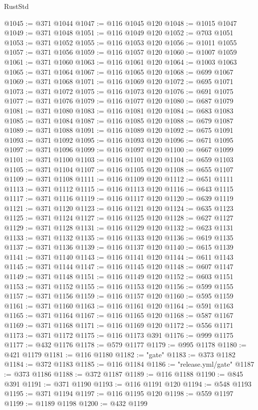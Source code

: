 \begin{lexlean}{RustStd}
\begin{coremodule}
@1045 := @371 @1044
@1047 := @116 @1045 @120
@1048 := @1015 @1047
@1049 := @371 @1048
@1051 := @116 @1049 @120
@1052 := @703 @1051
@1053 := @371 @1052
@1055 := @116 @1053 @120
@1056 := @1011 @1055
@1057 := @371 @1056
@1059 := @116 @1057 @120
@1060 := @1007 @1059
@1061 := @371 @1060
@1063 := @116 @1061 @120
@1064 := @1003 @1063
@1065 := @371 @1064
@1067 := @116 @1065 @120
@1068 := @699 @1067
@1069 := @371 @1068
@1071 := @116 @1069 @120
@1072 := @695 @1071
@1073 := @371 @1072
@1075 := @116 @1073 @120
@1076 := @691 @1075
@1077 := @371 @1076
@1079 := @116 @1077 @120
@1080 := @687 @1079
@1081 := @371 @1080
@1083 := @116 @1081 @120
@1084 := @683 @1083
@1085 := @371 @1084
@1087 := @116 @1085 @120
@1088 := @679 @1087
@1089 := @371 @1088
@1091 := @116 @1089 @120
@1092 := @675 @1091
@1093 := @371 @1092
@1095 := @116 @1093 @120
@1096 := @671 @1095
@1097 := @371 @1096
@1099 := @116 @1097 @120
@1100 := @667 @1099
@1101 := @371 @1100
@1103 := @116 @1101 @120
@1104 := @659 @1103
@1105 := @371 @1104
@1107 := @116 @1105 @120
@1108 := @655 @1107
@1109 := @371 @1108
@1111 := @116 @1109 @120
@1112 := @651 @1111
@1113 := @371 @1112
@1115 := @116 @1113 @120
@1116 := @643 @1115
@1117 := @371 @1116
@1119 := @116 @1117 @120
@1120 := @639 @1119
@1121 := @371 @1120
@1123 := @116 @1121 @120
@1124 := @635 @1123
@1125 := @371 @1124
@1127 := @116 @1125 @120
@1128 := @627 @1127
@1129 := @371 @1128
@1131 := @116 @1129 @120
@1132 := @623 @1131
@1133 := @371 @1132
@1135 := @116 @1133 @120
@1136 := @619 @1135
@1137 := @371 @1136
@1139 := @116 @1137 @120
@1140 := @615 @1139
@1141 := @371 @1140
@1143 := @116 @1141 @120
@1144 := @611 @1143
@1145 := @371 @1144
@1147 := @116 @1145 @120
@1148 := @607 @1147
@1149 := @371 @1148
@1151 := @116 @1149 @120
@1152 := @603 @1151
@1153 := @371 @1152
@1155 := @116 @1153 @120
@1156 := @599 @1155
@1157 := @371 @1156
@1159 := @116 @1157 @120
@1160 := @595 @1159
@1161 := @371 @1160
@1163 := @116 @1161 @120
@1164 := @591 @1163
@1165 := @371 @1164
@1167 := @116 @1165 @120
@1168 := @587 @1167
@1169 := @371 @1168
@1171 := @116 @1169 @120
@1172 := @556 @1171
@1173 := @371 @1172
@1175 := @116 @1173 @391
@1176 := @999 @1175
@1177 := @432 @1176
@1178 := @579 @1177
@1179 := @995 @1178
@1180 := @421 @1179
@1181 := @116 @1180
@1182 := "gate"
@1183 := @373 @1182
@1184 := @372 @1183
@1185 := @116 @1184
@1186 := "release.yml/gate"
@1187 := @373 @1186
@1188 := @372 @1187
@1189 := @116 @1188
@1190 := @845 @391
@1191 := @371 @1190
@1193 := @116 @1191 @120
@1194 := @548 @1193
@1195 := @371 @1194
@1197 := @116 @1195 @120
@1198 := @559 @1197
@1199 := @1189 @1198
@1200 := @432 @1199

\end{coremodule}
\end{lexlean}
